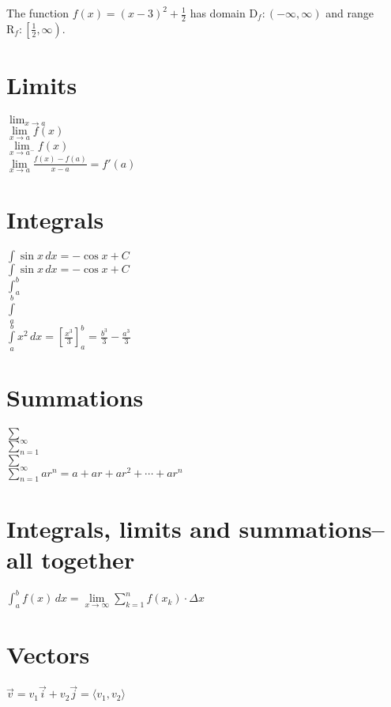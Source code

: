 \documentclass[11pt]{article}
\begin{document}
The function $f(x)=(x-3)^2+\frac{1}{2}$ has domain $\mathrm{D}_f:(-\infty, \infty)$ and range $\mathrm{R}_f:\left[\frac{1}{2}, \infty\right)$.\\

\section{Limits}

$\lim_{x \to a}$\\ %

$\lim\limits_{x \to a} f(x)$\\

$\lim\limits_{x \to a^-} f(x)$\\

$\displaystyle{\lim\limits_{x\to a}\frac{f(x)-f(a)}{x-a}=f'(a)}$\\

\section{Integrals}

$\int\sin x\,dx=-\cos x+C$\\

$\displaystyle{\int\sin x\,dx=-\cos x+C}$\\

$\displaystyle{\int_a^b}$\\

$\displaystyle{\int\limits_a^b}$\\

$\displaystyle{\int\limits_{a}^{b}x^2\,dx=\left[\frac{x^3}{3}\right]_{a}^{b}=\frac{b^3}{3}-\frac{a^3}{3}}$\\

\section{Summations}

$\sum$\\

$\displaystyle{\sum_{n=1}^{\infty}}$\\

$\displaystyle{\sum}$\\

$\displaystyle{\sum\limits_{n=1}^{\infty}ar^n=a+ar+ar^2+\cdots +ar^n}$\\

\section{Integrals, limits and summations--all together}

$\displaystyle{\int_a^b f(x)\,dx=\lim\limits_{x \to \infty}\sum\limits_{k=1}^{n}f(x_k)\cdot\Delta x}$\\

\newpage

\section{Vectors}

$\vec{v}=v_1 \vec{i}+v_2 \vec{j}=\langle v_1, v_2 \rangle$
\end{document}
